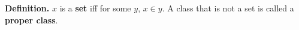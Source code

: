 \textbf{Definition.} $x$ is a \textbf{set} iff for some $y$, $x \in y$. A class that is not a set is called a \textbf{proper class}.
